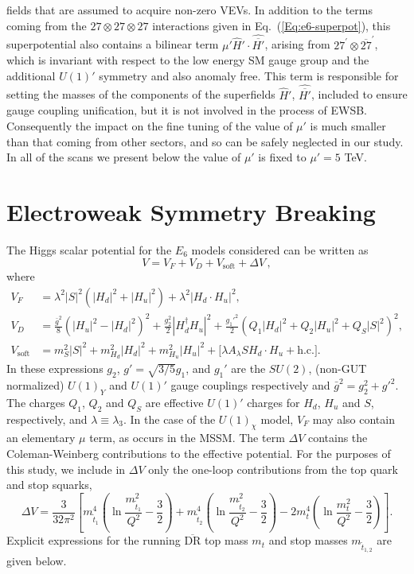 \documentclass[preprint,amsmath,amssymb,aps,superscriptaddress,prd,
showpacs,floatfix,nofootinbib]{revtex4-1}
\newcommand{\SuperField}[1]{\hat{#1}}
\begin{document}
fields that are assumed to acquire non-zero VEVs.  In addition to the
terms coming from the $27\otimes 27 \otimes 27$ interactions given in
Eq.~(\ref{Eq:e6-superpot}), this superpotential also contains a
bilinear term $\mu' \SuperField{H}'\cdot \SuperField{\overline{H'}}$,
arising from $27^\prime \otimes \overline{27}^\prime$, which is
invariant with respect to the low energy SM gauge group and the
additional $U(1)'$ symmetry and also anomaly free.  This term is
responsible for setting the masses of the components of the
superfields $\SuperField{H}'$, $\SuperField{\overline{H'}}$, included
to ensure gauge coupling unification, but it is not involved in the
process of EWSB.  Consequently the impact on the fine tuning of the
value of $\mu'$ is much smaller than that coming from other sectors,
and so can be safely neglected in our study. In all of the scans we
present below the value of $\mu'$ is fixed to $\mu' = 5$ TeV.

\section{\label{sec:ewsb}Electroweak Symmetry
Breaking}

The Higgs scalar potential for the $E_6$ models considered can be written as
\cite{King:2005jy}
\begin{equation} \label{eq:E6VeffOneLoop}
V = V_F + V_D + V_{\textrm{soft}} + \Delta V \, ,
\end{equation}
where
\begin{align}
V_F &= \lambda^2 |S|^2 (|H_d|^2 + |H_u|^2) + \lambda^2 |H_d \cdot H_u|^2 ,
\label{eq:E6VFterms} \\
V_D &= \frac{\bar{g}^2}{8} \left (|H_u|^2 - |H_d|^2 \right )^2 +
\frac{g_2^2}{2} |H_d^\dagger H_u|^2 + \frac{g_1'^2}{2} (Q_1 |H_d|^2 +
Q_2 |H_u|^2 + Q_S |S|^2)^2 , \label{eq:E6VDterms} \\
V_{\textrm{soft}} &= m_S^2 |S|^2 + m_{H_d}^2 |H_d|^2 + m_{H_u}^2 |H_u|^2 +
\Big [\lambda A_\lambda S H_d \cdot H_u + \textrm{h.c.} \Big ] .
\label{eq:E6Vsoft}
\end{align}
In these expressions $g_2$, $g' = \sqrt{3/5} g_1$, and $g_1'$ are the
$SU(2)$, (non-GUT normalized) $U(1)_Y$ and $U(1)'$ gauge couplings
respectively and $\bar{g}^2 = g_2^2 + g'^2$.  The charges $Q_1$, $Q_2$ and
$Q_S$ are effective $U(1)'$ charges for $H_d$, $H_u$ and $S$, respectively,
and $\lambda \equiv \lambda_3$.  In the case of the $U(1)_\chi$ model, $V_F$
may also contain an elementary $\mu$ term, as occurs in the MSSM.  The term
$\Delta V$ contains the Coleman-Weinberg contributions to the effective
potential.  For the purposes of this study, we include in $\Delta V$ only the
one-loop contributions from the top quark and stop squarks,
\begin{equation}
\Delta V = \frac{3}{32\pi^2} \left [ m_{\tilde{t}_1}^4 \left ( \ln
\frac{m_{\tilde{t}_1}^2}{Q^2} - \frac{3}{2} \right ) + m_{\tilde{t}_2}^4
\left ( \ln \frac{m_{\tilde{t}_2}^2}{Q^2} - \frac{3}{2} \right ) - 2m_t^4
\left ( \ln \frac{m_t^2}{Q^2} - \frac{3}{2} \right ) \right ] .
\label{Eq:DeltaV}
\end{equation}
Explicit expressions for the running $\overline{\textrm{DR}}$ top mass $m_t$
and stop masses $m_{\tilde{t}_{1,2}}$ are given below.
\end{document}
